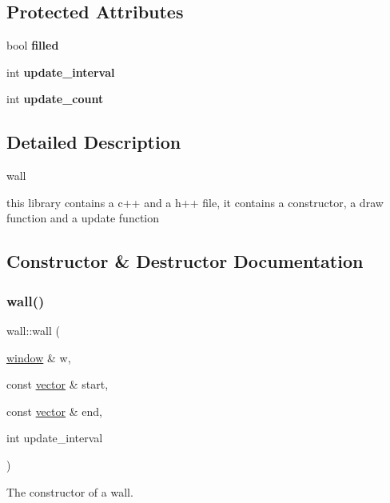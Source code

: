 \subsection*{Protected Attributes}
\begin{DoxyCompactItemize}
\item 
\mbox{\label{classwall_a2af7171cd8c999284e9ebdd7eac8cfea}} 
bool {\bfseries filled}
\item 
\mbox{\label{classwall_ab3bc2d0218d9c5b24969f74571bc9b96}} 
int {\bfseries update\+\_\+interval}
\item 
\mbox{\label{classwall_abaaa1fcf2ab29e7c4523b6526ad03f2f}} 
int {\bfseries update\+\_\+count}
\end{DoxyCompactItemize}


\subsection{Detailed Description}
wall 

this library contains a c++ and a h++ file, it contains a constructor, a draw function and a update function 

\subsection{Constructor \& Destructor Documentation}
\mbox{\label{classwall_a6bbd0a74571562b849a2446ba29978dc}} 
\subsubsection{\texorpdfstring{wall()}{wall()}}
{\footnotesize\ttfamily wall\+::wall (\begin{DoxyParamCaption}\item[{\hyperlink{classwindow}{window} \&}]{w,  }\item[{const \hyperlink{classvector}{vector} \&}]{start,  }\item[{const \hyperlink{classvector}{vector} \&}]{end,  }\item[{int}]{update\+\_\+interval }\end{DoxyParamCaption})}



The constructor of a wall. 

